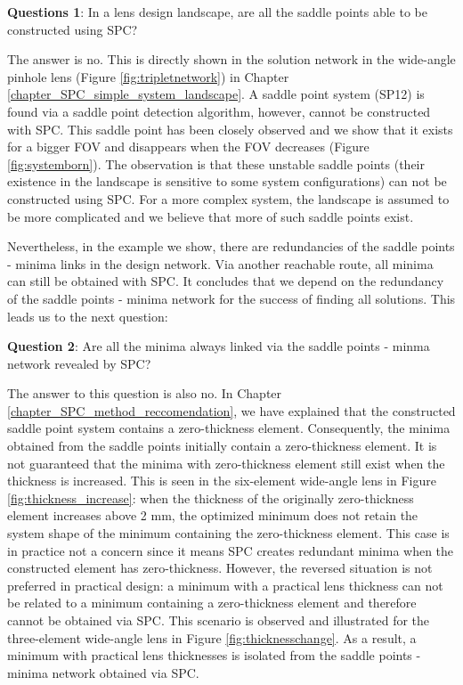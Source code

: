 \vspace{1em}

\textbf{Questions 1}:  In a lens design landscape, are all the saddle points able to be constructed using SPC? 

The answer is no. This is directly shown in the solution network in the wide-angle pinhole lens (Figure \ref{fig:tripletnetwork}) in Chapter \ref{chapter_SPC_simple_system_landscape}. A saddle point system (SP12) is found via a saddle point detection algorithm, however, cannot be constructed with SPC. This saddle point has been closely observed and we show that it exists for a bigger FOV and disappears when the FOV decreases (Figure \ref{fig:systemborn}). The observation is that these unstable saddle points (their existence in the landscape is sensitive to some system configurations) can not be constructed using SPC. For a more complex system, the landscape is assumed to be more complicated and we believe that more of such saddle points exist. 

Nevertheless, in the example we show, there are redundancies of the saddle points - minima links in the design network. Via another reachable route, all minima can still be obtained with SPC. It concludes that we depend on the redundancy of the saddle points - minima network for the success of finding all solutions. This leads us to the next question: 
\vspace{1em}

\textbf{Question 2}: Are all the minima always linked via the saddle points - minma network revealed by SPC?

The answer to this question is also no. In Chapter \ref{chapter_SPC_method_reccomendation}, we have explained that the constructed saddle point system contains a zero-thickness element. Consequently, the minima obtained from the saddle points initially contain a zero-thickness element. It is not guaranteed that the minima with zero-thickness element still exist when the thickness is increased. This is seen in the six-element wide-angle lens in Figure \ref{fig:thickness_increase}: when the thickness of the originally zero-thickness element increases above 2 mm, the optimized minimum does not retain the system shape of the minimum containing the zero-thickness element. This case is in practice not a concern since it means SPC creates redundant minima when the constructed element has zero-thickness. However, the reversed situation is not preferred in practical design: a minimum with a practical lens thickness can not be related to a minimum containing a zero-thickness element and therefore cannot be obtained via SPC. This scenario is observed and illustrated for the three-element wide-angle lens in Figure \ref{fig:thicknesschange}. As a result, a minimum with practical lens thicknesses is isolated from the saddle points - minima network obtained via SPC. 

